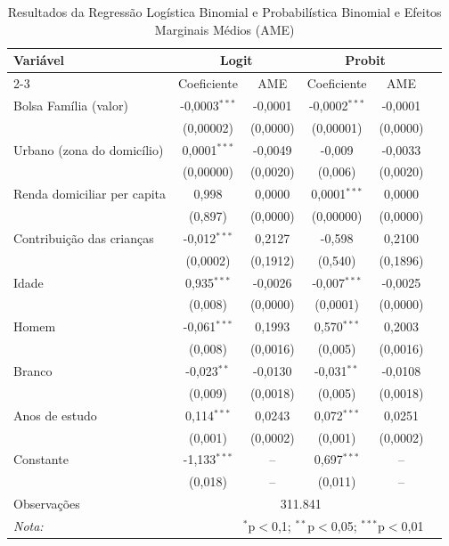 \documentclass[12pt, a4paper, openany]{book}
\numberwithin{equation}{chapter}
\numberwithin{table}{chapter}
\numberwithin{figure}{chapter}
\theoremstyle{break}
\begin{document}
\begin{table}[H] 
\centering 
\renewcommand{\arraystretch}{1.5} 
  \caption{Resultados da Regressão Logística Binomial e Probabilística Binomial e Efeitos Marginais Médios (AME)} 
  \label{tab:logit_probit} 
\begin{tabular}{lccccc} 
\hline 
\hline 
Variável & \multicolumn{2}{c}{\textbf{Logit}} & \multicolumn{2}{c}{\textbf{Probit}} \\ 
\cline{2-3} \cline{4-5} 
         & Coeficiente & AME & Coeficiente & AME \\ 
\hline 
Bolsa Família (valor) & -0,0003$^{***}$ & -0,0001 & -0,0002$^{***}$ & -0,0001 \\ 
                       & (0,00002) & (0,0000) & (0,00001) & (0,0000) \\ 
Urbano (zona do domicílio) & 0,0001$^{***}$ & -0,0049 & -0,009 & -0,0033 \\ 
                       & (0,00000) & (0,0020) & (0,006) & (0,0020) \\ 
Renda domiciliar per capita & 0,998 & 0,0000 & 0,0001$^{***}$ & 0,0000 \\ 
                            & (0,897) & (0,0000) & (0,00000) & (0,0000) \\ 
Contribuição das crianças & -0,012$^{***}$ & 0,2127 & -0,598 & 0,2100 \\ 
                           & (0,0002) & (0,1912) & (0,540) & (0,1896) \\ 
Idade & 0,935$^{***}$ & -0,0026 & -0,007$^{***}$ & -0,0025 \\ 
      & (0,008) & (0,0000) & (0,0001) & (0,0000) \\ 
Homem & -0,061$^{***}$ & 0,1993 & 0,570$^{***}$ & 0,2003 \\ 
      & (0,008) & (0,0016) & (0,005) & (0,0016) \\ 
Branco & -0,023$^{**}$ & -0,0130 & -0,031$^{**}$ & -0,0108 \\ 
       & (0,009) & (0,0018) & (0,005) & (0,0018) \\ 
Anos de estudo & 0,114$^{***}$ & 0,0243 & 0,072$^{***}$ & 0,0251 \\ 
               & (0,001) & (0,0002) & (0,001) & (0,0002) \\ 
Constante & -1,133$^{***}$ & -- & 0,697$^{***}$ & -- \\ 
          & (0,018) & -- & (0,011) & -- \\ 
\hline 
Observações & \multicolumn{4}{c}{311.841} \\ 
\hline 
\hline 
\textit{Nota:} & \multicolumn{4}{r}{$^{*}$p$<$0,1; $^{**}$p$<$0,05; $^{***}$p$<$0,01} \\ 
\end{tabular} 
\end{table}
\end{document}
